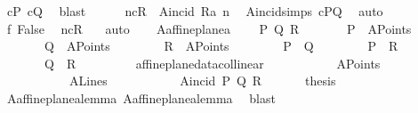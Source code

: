 \begin{isabellebody}
\ cP\ cQ\ \isamarkupfalse%
\ blast\isanewline
\ \ \ \ \isamarkupfalse%
\ ncR{\isacharcolon}{\kern0pt}\ {\isachardoublequoteopen}{\isasymnot}\ A{}incid\ Ra\ n{\isachardoublequoteclose}\ \isamarkupfalse%
\ A{}incid{\isachardot}{\kern0pt}simps\ cPQ\ \isamarkupfalse%
\ auto\isanewline
\ \ \ \ \isamarkupfalse%
\ f{\isacharcolon}{\kern0pt}\ False\ \isamarkupfalse%
\ ncR\ {}\ \isamarkupfalse%
\ auto\isanewline
\ \ \isamarkupfalse%
\isanewline
{}\isamarkupfalse%
%
\endisatagproof
{\isafoldproof}%
%
\isadelimproof
\isanewline
%
\endisadelimproof
\isanewline
{}\isamarkupfalse%
\ A{}affine{\isacharunderscore}{\kern0pt}plane{\isacharunderscore}{\kern0pt}a{}{\isacharcolon}{\kern0pt}\ \isanewline
\ \ {\isachardoublequoteopen}\ {\isasymexists}P\ Q\ R{\isachardot}{\kern0pt}\isanewline
\ \ \ \ \ \ \ P\ {\isasymin}\ A{}Points\ {\isasymand}\isanewline
\ \ \ \ \ \ \ Q\ {\isasymin}\ A{}Points\ {\isasymand}\isanewline
\ \ \ \ \ \ \ R\ {\isasymin}\ A{}Points\ {\isasymand}\isanewline
\ \ \ \ \ \ \ P\ {\isasymnoteq}\ Q\ {\isasymand}\isanewline
\ \ \ \ \ \ \ P\ {\isasymnoteq}\ R\ {\isasymand}\isanewline
\ \ \ \ \ \ \ Q\ {\isasymnoteq}\ R\ {\isasymand}\isanewline
\ \ \ \ \ \ \ {\isasymnot}\ affine{\isacharunderscore}{\kern0pt}plane{\isacharunderscore}{\kern0pt}data{\isachardot}{\kern0pt}collinear\isanewline
\ \ \ \ \ \ \ \ \ \ \ A{}Points\isanewline
\ \ \ \ \ \ \ \ \ \ \ A{}Lines\isanewline
\ \ \ \ \ \ \ \ \ \ \ A{}incid\ P\ Q\ R{\isachardoublequoteclose}\ \isanewline
%
\isadelimproof
%
\endisadelimproof
%
\isatagproof
{}\isamarkupfalse%
\ {\isacharminus}{\kern0pt}\isanewline
\ \ \isamarkupfalse%
\ {\isacharquery}{\kern0pt}thesis\ \ \isamarkupfalse%
\ A{}affine{\isacharunderscore}{\kern0pt}plane{\isacharunderscore}{\kern0pt}a{}{\isacharunderscore}{\kern0pt}lemma{\isacharparenleft}{\kern0pt}{}{\isacharparenright}{\kern0pt}\ A{}affine{\isacharunderscore}{\kern0pt}plane{\isacharunderscore}{\kern0pt}a{}{\isacharunderscore}{\kern0pt}lemma{\isacharparenleft}{\kern0pt}{}{\isacharparenright}{\kern0pt}\ \isamarkupfalse%
\ blast\isanewline
{}\isamarkupfalse%
%
\endisatagproof
{\isafoldproof}%
%
\isadelimproof

\end{isabellebody}
